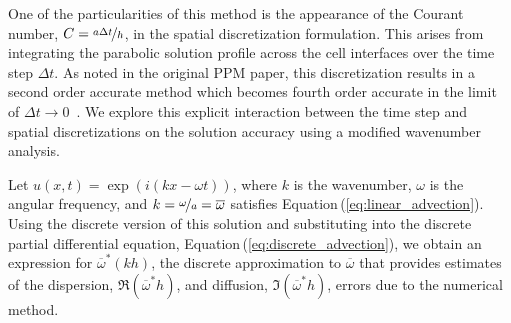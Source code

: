 \documentclass[review]{elsarticle}
\begin{document}
One of the particularities of this method is the appearance of the
Courant number, $C = \nicefrac{a\Delta t}{h}$, in the spatial
discretization formulation. This arises from integrating the parabolic
solution profile across the cell interfaces over the time step
$\Delta t$. As noted in the original PPM paper, this discretization
results in a second order accurate method which becomes fourth order
accurate in the limit of $\Delta t \to 0$~\cite{Colella1984}. We
explore this explicit interaction between the time step and spatial
discretizations on the solution accuracy using a modified wavenumber
analysis.

Let $u(x,t) = \exp{\left( i(kx-\omega t) \right)}$, where $k$ is the
wavenumber, $\omega$ is the angular frequency, and
$k = \nicefrac{\omega}{a} = \overline{\omega}$ satisfies
Equation\,(\ref{eq:linear_advection}). Using the discrete version of
this solution and substituting into the discrete partial differential
equation, Equation\,(\ref{eq:discrete_advection}), we obtain an
expression for $\overline{\omega}^*(kh)$, the discrete approximation
to $\overline{\omega}$ that provides estimates of the dispersion,
$\Re (\overline{\omega}^* h)$, and diffusion,
$\Im (\overline{\omega}^* h)$, errors due to the numerical method.


\end{document}
